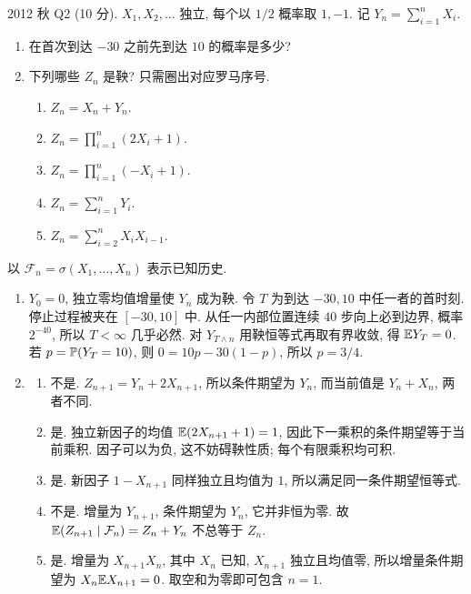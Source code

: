 \begin{exercise}\label{ex:fe2012q2}
2012 秋 Q2 (10 分). $X_1,X_2,\ldots$ 独立, 每个以 $1/2$ 概率取 $1,-1$. 记 $Y_n=\sum_{i=1}^nX_i$.
\begin{enumerate}[label=(\alph*)]
\item\label{ex:fe2012q2-a} 在首次到达 $-30$ 之前先到达 $10$ 的概率是多少?
\item 下列哪些 $Z_n$ 是鞅? 只需圈出对应罗马序号.
\begin{enumerate}[label=(\roman*)]
\item\label{ex:fe2012q2-b-i} $Z_n=X_n+Y_n$.
\item\label{ex:fe2012q2-b-ii} $Z_n=\prod_{i=1}^n(2X_i+1)$.
\item\label{ex:fe2012q2-b-iii} $Z_n=\prod_{i=1}^n(-X_i+1)$.
\item\label{ex:fe2012q2-b-iv} $Z_n=\sum_{i=1}^nY_i$.
\item\label{ex:fe2012q2-b-v} $Z_n=\sum_{i=2}^nX_iX_{i-1}$.
\end{enumerate}
\end{enumerate}
\end{exercise}
\begin{solution}
以 $\mathcal F_n=\sigma(X_1,\ldots,X_n)$ 表示已知历史.
\begin{enumerate}[label=(\alph*)]
\item\label{sol:fe2012q2-a} $Y_0=0$, 独立零均值增量使 $Y_n$ 成为鞅. 令 $T$ 为到达 $-30,10$ 中任一者的首时刻. 停止过程被夹在 $[-30,10]$ 中. 从任一内部位置连续 $40$ 步向上必到边界, 概率 $2^{-40}$, 所以 $T<\infty$ 几乎必然. 对 $Y_{T\wedge n}$ 用鞅恒等式再取有界收敛, 得 $\mathbb E Y_T=0$. 若 $p=\mathbb P(Y_T=10)$, 则 $0=10p-30(1-p)$, 所以 $p=3/4$.
\item
\begin{enumerate}[label=(\roman*)]
\item\label{sol:fe2012q2-b-i} 不是. $Z_{n+1}=Y_n+2X_{n+1}$, 所以条件期望为 $Y_n$, 而当前值是 $Y_n+X_n$, 两者不同.
\item\label{sol:fe2012q2-b-ii} 是. 独立新因子的均值 $\mathbb E(2X_{n+1}+1)=1$, 因此下一乘积的条件期望等于当前乘积. 因子可以为负, 这不妨碍鞅性质; 每个有限乘积均可积.
\item\label{sol:fe2012q2-b-iii} 是. 新因子 $1-X_{n+1}$ 同样独立且均值为 $1$, 所以满足同一条件期望恒等式.
\item\label{sol:fe2012q2-b-iv} 不是. 增量为 $Y_{n+1}$, 条件期望为 $Y_n$, 它并非恒为零. 故 $\mathbb E(Z_{n+1}\mid\mathcal F_n)=Z_n+Y_n$ 不总等于 $Z_n$.
\item\label{sol:fe2012q2-b-v} 是. 增量为 $X_{n+1}X_n$, 其中 $X_n$ 已知, $X_{n+1}$ 独立且均值零, 所以增量条件期望为 $X_n\mathbb E X_{n+1}=0$. 取空和为零即可包含 $n=1$.
\end{enumerate}
\end{enumerate}
\end{solution}

